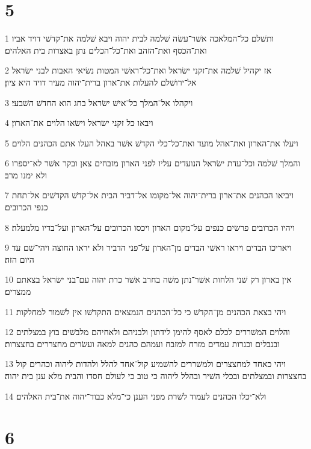 \chapter{5}

\par 1 ותשׁלם כל־המלאכה אשׁר־עשׂה שׁלמה לבית יהוה ויבא שׁלמה את־קדשׁי דויד אביו ואת־הכסף ואת־הזהב ואת־כל־הכלים נתן באצרות בית האלהים׃
\par 2 אז יקהיל שׁלמה את־זקני ישׂראל ואת־כל־ראשׁי המטות נשׂיאי האבות לבני ישׂראל אל־ירושׁלם להעלות את־ארון ברית־יהוה מעיר דויד היא ציון׃
\par 3 ויקהלו אל־המלך כל־אישׁ ישׂראל בחג הוא החדשׁ השׁבעי׃
\par 4 ויבאו כל זקני ישׂראל וישׂאו הלוים את־הארון׃
\par 5 ויעלו את־הארון ואת־אהל מועד ואת־כל־כלי הקדשׁ אשׁר באהל העלו אתם הכהנים הלוים׃
\par 6 והמלך שׁלמה וכל־עדת ישׂראל הנועדים עליו לפני הארון מזבחים צאן ובקר אשׁר לא־יספרו ולא ימנו מרב׃
\par 7 ויביאו הכהנים את־ארון ברית־יהוה אל־מקומו אל־דביר הבית אל־קדשׁ הקדשׁים אל־תחת כנפי הכרובים׃
\par 8 ויהיו הכרובים פרשׂים כנפים על־מקום הארון ויכסו הכרובים על־הארון ועל־בדיו מלמעלה׃
\par 9 ויאריכו הבדים ויראו ראשׁי הבדים מן־הארון על־פני הדביר ולא יראו החוצה ויהי־שׁם עד היום הזה׃
\par 10 אין בארון רק שׁני הלחות אשׁר־נתן משׁה בחרב אשׁר כרת יהוה עם־בני ישׂראל בצאתם ממצרים׃
\par 11 ויהי בצאת הכהנים מן־הקדשׁ כי כל־הכהנים הנמצאים התקדשׁו אין לשׁמור למחלקות׃
\par 12 והלוים המשׁררים לכלם לאסף להימן לידתון ולבניהם ולאחיהם מלבשׁים בוץ במצלתים ובנבלים וכנרות עמדים מזרח למזבח ועמהם כהנים למאה ועשׂרים מחצררים בחצצרות׃
\par 13 ויהי כאחד למחצצרים ולמשׁררים להשׁמיע קול־אחד להלל ולהדות ליהוה וכהרים קול בחצצרות ובמצלתים ובכלי השׁיר ובהלל ליהוה כי טוב כי לעולם חסדו והבית מלא ענן בית יהוה׃
\par 14 ולא־יכלו הכהנים לעמוד לשׁרת מפני הענן כי־מלא כבוד־יהוה את־בית האלהים׃

\chapter{6}

